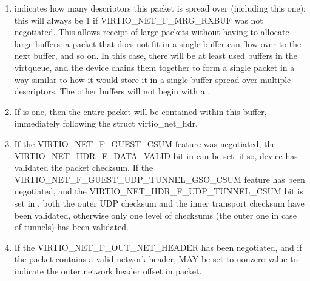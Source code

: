 \begin{enumerate}
\item {} indicates how many descriptors
  this packet is spread over (including this one): this will
  always be 1 if VIRTIO_NET_F_MRG_RXBUF was not negotiated.
  This allows receipt of large packets without having to allocate large
  buffers: a packet that does not fit in a single buffer can flow
  over to the next buffer, and so on. In this case, there will be
  at least  used buffers in the virtqueue, and the device
  chains them together to form a single packet in a way similar to
  how it would store it in a single buffer spread over multiple
  descriptors.
  The other buffers will not begin with a .

\item If
   is one, then the entire packet will be
  contained within this buffer, immediately following the struct
  virtio_net_hdr.
\item If the VIRTIO_NET_F_GUEST_CSUM feature was negotiated, the
  VIRTIO_NET_HDR_F_DATA_VALID bit in  can be
  set: if so, device has validated the packet checksum.
  If the VIRTIO_NET_F_GUEST_UDP_TUNNEL_GSO_CSUM feature has been negotiated,
  and the VIRTIO_NET_HDR_F_UDP_TUNNEL_CSUM bit is set in ,
  both the outer UDP checksum and the inner transport checksum
  have been validated, otherwise only one level of checksums (the outer one
  in case of tunnels) has been validated.
\item If the VIRTIO_NET_F_OUT_NET_HEADER has been negotiated, and if the packet
  contains a valid network header,  MAY be set to nonzero
  value to indicate the outer network header offset in packet.
\end{enumerate}

